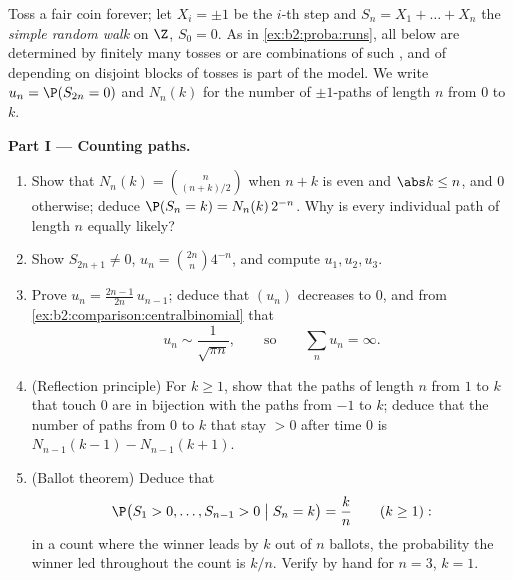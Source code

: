 \begin{problem}\label{pb:b2:proba:1}
Toss a fair coin forever; let $X_i = \pm1$ be the $i$-th step
and $S_n = X_1 + \dots + X_n$ the \emph{simple random
walk} on $\Z$, $S_0 = 0$. As in
\cref{ex:b2:proba:runs}, all  below are determined by
finitely many tosses or are  combinations of such
, and  of  depending on disjoint
blocks of tosses is part of the model. We write $u_n =
\P(S_{2n} = 0)$ and $N_n(k)$ for the number of $\pm1$-paths of
length $n$ from $0$ to $k$.

\medskip
\noindent\textbf{Part I --- Counting paths.}
\begin{enumerate}
  \item Show that $N_n(k) = \binom{n}{(n+k)/2}$ when $n + k$
        is even and $\abs k \leq n$, and $0$ otherwise; deduce
        $\P(S_n = k) = N_n(k)\,2^{-n}$. Why is every
        individual path of length $n$ equally likely?
  \item Show $S_{2n+1} \neq 0$, $u_n =
        \binom{2n}{n}4^{-n}$, and compute $u_1, u_2, u_3$.
  \item Prove $u_n = \frac{2n-1}{2n}\,u_{n-1}$; deduce that
        $(u_n)$ decreases to $0$, and from
        \cref{ex:b2:comparison:centralbinomial} that
        \[
        u_n \sim \frac{1}{\sqrt{\pi n}},
        \qquad\text{so}\qquad
        \sum_n u_n = \infty .
        \]
  \item (Reflection principle) For $k \geq 1$, show that the
        paths of length $n$ from $1$ to $k$ that touch $0$
        are in bijection with the paths from $-1$ to $k$;
        deduce that the number of paths from $0$ to $k$ that
        stay $> 0$ after time $0$ is $N_{n-1}(k-1) -
        N_{n-1}(k+1)$.
  \item (Ballot theorem) Deduce that
        \[
        \P\bigl(S_1 > 0, \dots, S_{n-1} > 0 \bigm| S_n =
        k\bigr) = \frac kn \qquad (k \geq 1) :
        \]
        in a count where the winner leads by $k$ out of $n$
        ballots, the probability the winner led throughout
        the count is $k/n$. Verify by hand for $n = 3$, $k =
        1$.
\end{enumerate}


\end{problem}
